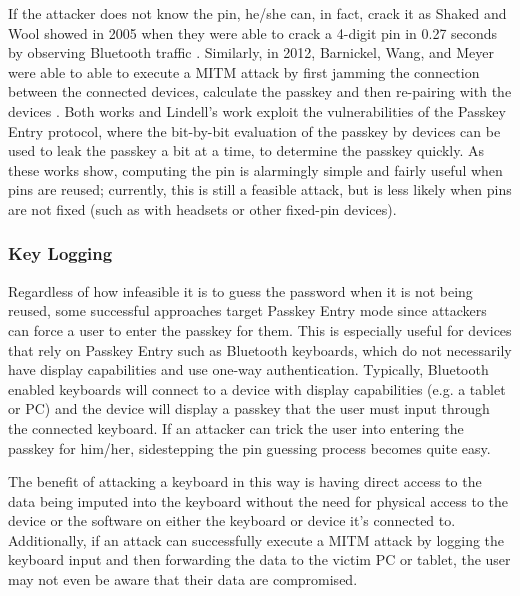 \documentclass{acm_proc_article-sp}
\begin{document}
If the attacker does not know the pin, he/she can, in fact, crack it as Shaked and Wool showed in 2005 when they were able to crack a 4-digit pin in 0.27 seconds by observing Bluetooth traffic \cite{shaked2005cracking}. Similarly, in 2012, Barnickel, Wang, and Meyer were able to able to execute a MITM attack by first jamming the connection between the connected devices, calculate the passkey and then re-pairing with the devices \cite{barnickel2012implementing}. Both works and Lindell's work exploit the vulnerabilities of the Passkey Entry protocol, where the bit-by-bit evaluation of the passkey by devices can be used to leak the passkey a bit at a time, to determine the passkey quickly. As these works show, computing the pin is alarmingly simple and fairly useful when pins are reused; currently, this is still a feasible attack, but is less likely when pins are not fixed (such as with headsets or other fixed-pin devices).

\subsubsection{Key Logging}
Regardless of how infeasible it is to guess the password when it is not being reused, some successful approaches target Passkey Entry mode since attackers can force a user to enter the passkey for them. This is especially useful for devices that rely on Passkey Entry such as Bluetooth keyboards, which do not necessarily have display capabilities and use one-way authentication. Typically, Bluetooth enabled keyboards will connect to a device with display capabilities (e.g. a tablet or PC) and the device will display a passkey that the user must input through the connected keyboard. If an attacker can trick the user into entering the passkey for him/her, sidestepping the pin guessing process becomes quite easy. 

The benefit of attacking a keyboard in this way is having direct access to the data being imputed into the keyboard without the need for physical access to the device or the software on either the keyboard or device it's connected to. Additionally, if an attack can successfully execute a MITM attack by logging the keyboard input and then forwarding the data to the victim PC or tablet, the user may not even be aware that their data are compromised. 
\end{document}
